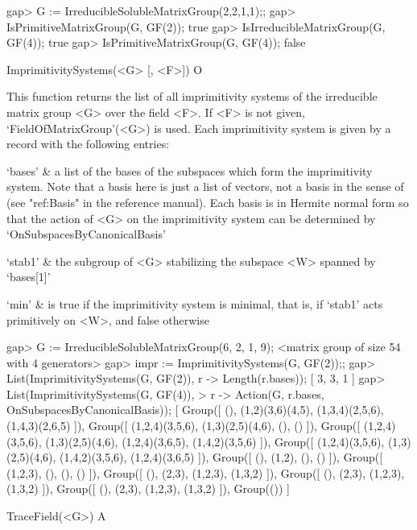 \beginexample
gap> G := IrreducibleSolubleMatrixGroup(2,2,1,1);;
gap> IsPrimitiveMatrixGroup(G, GF(2));
true
gap> IsIrreducibleMatrixGroup(G, GF(4));
true
gap> IsPrimitiveMatrixGroup(G, GF(4));
false
\endexample

\>ImprimitivitySystems(<G> [, <F>]) O

This function returns the list of all imprimitivity systems of the 
irreducible matrix group <G> over the field <F>. If <F> is not given, 
`FieldOfMatrixGroup'(<G>) is used. 
Each imprimitivity system is given by a record with the following entries:

\beginitems
`bases' & a list of the bases of the subspaces which form the imprimitivity system. 
          Note that a basis here is just a list of vectors, not a basis in the sense of
          {\GAP} (see "ref:Basis" in the {\GAP} reference manual). Each basis is
          in Hermite normal form so that the action of <G> on the imprimitivity
          system can be determined by `OnSubspacesByCanonicalBasis'
          
`stab1' & the subgroup of <G> stabilizing the subspace <W> spanned by `bases[1]'

`min'   & is true if the imprimitivity system is minimal, that is, if `stab1' 
          acts primitively on <W>, and false otherwise 
\enditems

\beginexample
gap> G := IrreducibleSolubleMatrixGroup(6, 2, 1, 9);
<matrix group of size 54 with 4 generators>
gap> impr := ImprimitivitySystems(G, GF(2));;
gap> List(ImprimitivitySystems(G, GF(2)), r -> Length(r.bases));
[ 3, 3, 1 ]
gap> List(ImprimitivitySystems(G, GF(4)), 
>        r -> Action(G, r.bases, OnSubspacesByCanonicalBasis));
[ Group([ (), (1,2)(3,6)(4,5), (1,3,4)(2,5,6), (1,4,3)(2,6,5) ]), 
  Group([ (1,2,4)(3,5,6), (1,3)(2,5)(4,6), (), () ]), 
  Group([ (1,2,4)(3,5,6), (1,3)(2,5)(4,6), (1,2,4)(3,6,5), (1,4,2)(3,5,6) ]), 
  Group([ (1,2,4)(3,5,6), (1,3)(2,5)(4,6), (1,4,2)(3,5,6), (1,2,4)(3,6,5) ]), 
  Group([ (), (1,2), (), () ]), Group([ (1,2,3), (), (), () ]), 
  Group([ (), (2,3), (1,2,3), (1,3,2) ]), 
  Group([ (), (2,3), (1,2,3), (1,3,2) ]), 
  Group([ (), (2,3), (1,2,3), (1,3,2) ]), Group(()) ]
\endexample


\null


\>TraceField(<G>) A

